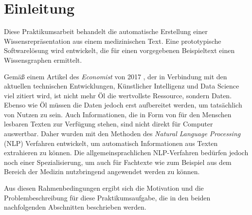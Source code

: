 \renewcommand{\chaptermark}[1]{\markboth{\spacedlowsmallcaps{#1}}{\spacedlowsmallcaps{#1}}}
\renewcommand{\sectionmark}[1]{\markright{\thesection\enspace\spacedlowsmallcaps{#1}}}

\chapter{Einleitung}

Diese Praktikumsarbeit behandelt die automatische Erstellung einer Wissensrepräsentation aus einem medizinischen Text. Eine prototypische Softwarelösung wird entwickelt, die für einen vorgegebenen Beispieltext einen Wissensgraphen ermittelt.

Gemäß einem Artikel des \emph{Economist} von 2017 \cite{the_economist_worlds_2017}, der in Verbindung mit den aktuellen technischen Entwicklungen, Künstlicher Intelligenz und Data Science viel zitiert wird, ist nicht mehr Öl die wertvollste Ressource, sondern Daten. Ebenso wie Öl müssen die Daten jedoch erst aufbereitet werden, um tatsächlich von Nutzen zu sein. Auch Informationen, die in Form von für den Menschen lesbaren Texten zur Verfügung stehen, sind nicht direkt für Computer auswertbar. Daher wurden mit den Methoden des \emph{Natural Language Processing} (NLP) Verfahren entwickelt, um automatisch Informationen aus Texten extrahieren zu können. Die allgemeinsprachlichen NLP-Verfahren bedürfen jedoch noch einer Spezialisierung, um auch für Fachtexte wie zum Beispiel aus dem Bereich der Medizin nutzbringend angewendet werden zu können.

Aus diesen Rahmenbedingungen ergibt sich die Motivation und die Problembeschreibung für diese Praktikumsaufgabe, die in den beiden nachfolgenden Abschnitten beschrieben werden.